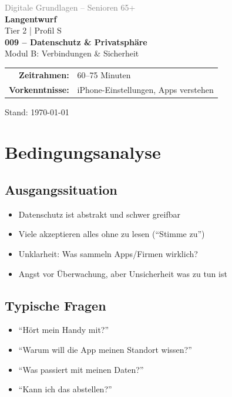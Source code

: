 \documentclass[11pt,a4paper]{article}
\begin{document}
\begin{titlepage}
    \centering
    \vspace*{2cm}
    {\Large\textcolor{gray}{Digitale Grundlagen -- Senioren 65+}}\\[2cm]
    {\Huge\textcolor{fach}{\textbf{Langentwurf}}}\\[0.5cm]
    {\large Tier 2 | Profil S}\\[2cm]
    {\LARGE\textbf{009 -- Datenschutz \& Privatsphäre}}\\[0.5cm]
    {\large Modul B: Verbindungen \& Sicherheit}\\[2cm]
    \begin{tabular}{rl}
        \textbf{Zeitrahmen:} & 60--75 Minuten \\
        \textbf{Vorkenntnisse:} & iPhone-Einstellungen, Apps verstehen \\
    \end{tabular}
    \vfill
    {\normalsize Stand: \today}
\end{titlepage}

\tableofcontents
\newpage

\section{Bedingungsanalyse}

\subsection{Ausgangssituation}
\begin{itemize}
    \item Datenschutz ist abstrakt und schwer greifbar
    \item Viele akzeptieren alles ohne zu lesen (``Stimme zu'')
    \item Unklarheit: Was sammeln Apps/Firmen wirklich?
    \item Angst vor Überwachung, aber Unsicherheit was zu tun ist
\end{itemize}

\subsection{Typische Fragen}
\begin{itemize}
    \item ``Hört mein Handy mit?''
    \item ``Warum will die App meinen Standort wissen?''
    \item ``Was passiert mit meinen Daten?''
    \item ``Kann ich das abstellen?''
\end{itemize}
\end{document}
